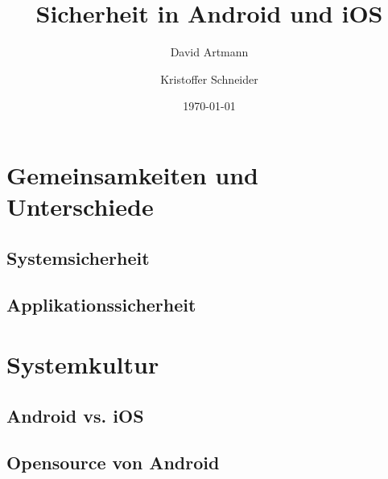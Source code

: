 \documentclass[aspectratio=169]{beamer}
\title{Sicherheit in Android und iOS}
\author{David Artmann\inst{1} \and Kristoffer Schneider\inst{1}}
\institute[Universities of]
{
\inst{1}
Hochschule für angewandte Wissenschaften\\
Würzburg-Schweinfurt
}
\date{\today}
\begin{document}




\section{Gemeinsamkeiten und Unterschiede}
	\subsection[Systemsicherheit]{Systemsicherheit}
		
	\subsection[Applikationssicherheit]{Applikationssicherheit}
		
		
		
\section{Systemkultur}
	\subsection{Android vs. iOS}
		
	\subsection{Opensource von Android}
		
		
		
		
		
\end{document}
